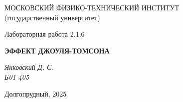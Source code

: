 \thispagestyle{empty}

\begin{center}
    МОСКОВСКИЙ ФИЗИКО-ТЕХНИЧЕСКИЙ ИНСТИТУТ \\
    (государственный университет)
\end{center}

\vfill

\begin{center}
    Лабораторная работа 2.1.6 \\ 
    \vspace{20pt}
    
    \textbf{ЭФФЕКТ ДЖОУЛЯ-ТОМСОНА} \\
\end{center}  

\begin{center}
    \textit{Янковский Д. С.} \\
    \textit{Б01-405} \\
\end{center}  

\vfill

\begin{center}
    Долгопрудный, 2025
\end{center}